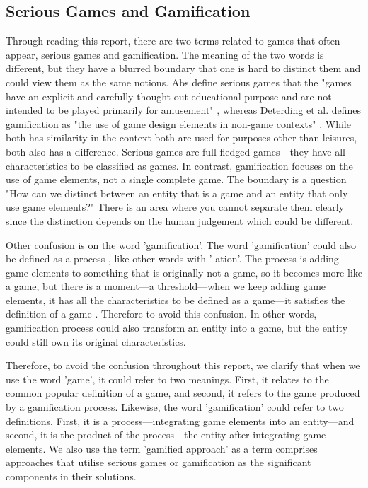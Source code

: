 \documentclass[12pt, a4paper]{report}
\begin{document}
\subsection{Serious Games and Gamification}
Through reading this report, there are two terms related to games that often appear, serious games and gamification. The meaning of the two words is different, but they have a blurred boundary that one is hard to distinct them and could view them as the same notions. Abs define serious games that the "games have an explicit and carefully thought-out educational purpose and are not intended to be played primarily for amusement" \cite{abt1987serious}, whereas Deterding et al. defines gamification as "the use of game design elements in non-game contexts" \cite{deterding2011game}. While both has similarity in the context both are used for purposes other than leisures, both also has a difference. Serious games are full-fledged games---they have all characteristics to be classified as games. In contrast, gamification focuses on the use of game elements, not a single complete game. The boundary is a question "How can we distinct between an entity that is a game and an entity that only use game elements?" There is an area where you cannot separate them clearly since the distinction depends on the human judgement which could be different.

Other confusion is on the word 'gamification'. The word 'gamification' could also be defined as a process \cite{werbach2014re}, like other words with '-ation'. The process is adding game elements to something that is originally not a game, so it becomes more like a game, but there is a moment---a threshold---when we keep adding game elements, it has all the characteristics to be defined as a game---it satisfies the definition of a game \cite{yohannis2014defining}. Therefore to avoid this confusion. In other words, gamification process could also transform an entity into a game, but the entity could still own its original characteristics. 

Therefore, to avoid the confusion throughout this report, we clarify that when we use the word 'game', it could refer to two meanings. First, it relates to the common popular definition of a game, and second, it refers to the game produced by a gamification process. Likewise, the word 'gamification' could refer to two definitions. First, it is a process---integrating game elements into an entity---and second, it is the product of the process---the entity after integrating game elements. We also use the term 'gamified approach' as a term comprises approaches that utilise serious games or gamification as the significant components in their solutions. 
\end{document}
